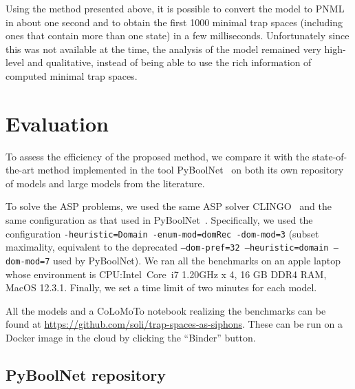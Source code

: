 \documentclass[runningheads]{llncs}
\begin{document}
Using the method presented above, it is possible to convert the model to PNML in about one second and to obtain the first 1000 minimal trap spaces (including ones that contain more than one state) in a few milliseconds.
Unfortunately since this was not available at the time, the analysis of the model remained very high-level and qualitative, instead of being able to use the rich information of computed minimal trap spaces.

\section{Evaluation}%
\label{sec:eval}

To assess the efficiency of the proposed method, we compare it with the state-of-the-art method implemented in the tool PyBoolNet~\cite{klarner2015computing,klarner2017pyboolnet} on both its own repository of models and large models from the literature.

To solve the ASP problems, we used the same ASP solver CLINGO~\cite{DBLP:journals/aicom/GebserKKOSS11} and the same configuration as that used in PyBoolNet~\cite{klarner2015computing,klarner2017pyboolnet}.
Specifically, we used the configuration \texttt{-heuristic=Domain -enum-mod=domRec -dom-mod=3} (subset maximality, equivalent to the deprecated \texttt{--dom-pref=32 --heuristic=domain --dom-mod=7} used by PyBoolNet). We ran all the benchmarks on an apple laptop whose environment is CPU:\@ Intel\textregistered\ Core\texttrademark\ i7 1.20GHz x 4, 16 GB DDR4 RAM, MacOS 12.3.1. Finally, we set a time limit of two minutes for each model.

All the models and a CoLoMoTo notebook realizing the benchmarks can be found at \url{https://github.com/soli/trap-spaces-as-siphons}. These can be run on a Docker image in the cloud by clicking the ``Binder'' button.

\subsection{PyBoolNet repository}
\end{document}
